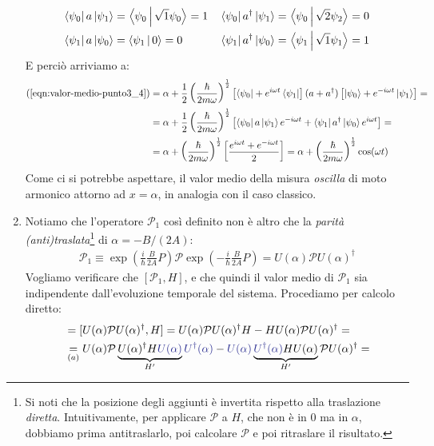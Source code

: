 \documentclass[../../FisicaTeorica.tex]{subfiles}
\begin{document}
\begin{enumerate}
\begin{align*}
\Bra{\psi_0}a\Ket{\psi_1} &= \Braket{\psi_0|\sqrt{1}\psi_0}=1 && \Bra{\psi_0} a^\dag \Ket{\psi_1} =\Braket{\psi_0|\sqrt{2}\psi_2}=0\\
\Bra{\psi_1}a\Ket{\psi_0} &= \Braket{\psi_1|0}= 0 && \Bra{\psi_1}a^\dag \Ket{\psi_0} = \Braket{\psi_1|\sqrt{1}\psi_1}=1
\end{align*}
E perciò arriviamo a:
\begin{align*}
(\ref{eqn:valor-medio-punto3_4}) &=\alpha+
\frac{1}{2}\left(\frac{\hbar}{2m\omega}\right)^\frac{1}{2} \left[\Bra{\psi_0} + e^{i\omega t}\Bra{\psi_1}\right](a+a^\dag) \left[\Ket{\psi_0} + e^{-i\omega t}\Ket{\psi_1}\right] =\\
&=\alpha + \frac{1}{2}\left(\frac{\hbar}{2m\omega}\right)^{\frac{1}{2}} \left[ \Bra{\psi_0}a\Ket{\psi_1} e^{-i\omega t} + \Bra{\psi_1}a^\dag \Ket{\psi_0} e^{i\omega t}\right] =\\
&=\alpha + \left(\frac{\hbar}{2m\omega}\right)^{\frac{1}{2}}\left[\frac{e^{i\omega t}+e^{-i\omega t}}{2}\right]=\alpha+\left(\frac{\hbar}{2m\omega}\right)^{\frac{1}{2}}\cos(\omega t)
\end{align*}
Come ci si potrebbe aspettare, il valor medio della misura \textit{oscilla} di moto armonico attorno ad $x=\alpha$, in analogia con il caso classico. 
\item Notiamo che l'operatore $\mathcal{P}_1$ così definito non è altro che la \textit{parità (anti)traslata}\footnote{Si noti che la posizione degli aggiunti è invertita rispetto alla traslazione \textit{diretta}. Intuitivamente, per applicare $\mathcal{P}$ a $H$, che non è  in $0$ ma in $\alpha$, dobbiamo prima antitraslarlo, poi calcolare $\mathcal{P}$ e poi ritraslare il risultato.} di $\alpha=-B/(2A)$: \begin{align*}
\mathcal{P}_1 \equiv \exp\left(\frac{i}{\hbar}\frac{B}{2A}P\right)\mathcal{P}\exp\left(-\frac{i}{\hbar}\frac{B}{2A}P\right)=U(\alpha)\mathcal{P}U(\alpha)^\dag
\end{align*}
Vogliamo verificare che $[\mathcal{P}_1, H]$, e che quindi il valor medio di $\mathcal{P}_1$ sia indipendente dall'evoluzione temporale del sistema. Procediamo per calcolo diretto:
\begin{align*}
[\mathcal{P}_1,H] &= [U(\alpha)\mathcal{P}U(\alpha)^\dag, H] = U(\alpha)\mathcal{P}U(\alpha)^\dag H - HU(\alpha)\mathcal{P}U(\alpha)^\dag=\\
&\underset{(a)}{=}U(\alpha) \mathcal{P}\underbrace{U(\alpha)^\dag H \textcolor{Blue}{U(\alpha)}}_{H'}\textcolor{Blue}{U^\dag(\alpha)} - \textcolor{Blue}{U(\alpha)}\underbrace{\textcolor{Blue}{U^\dag(\alpha)} HU(\alpha)}_{H'}\mathcal{P}U(\alpha)^\dag =\\

\end{align*}
\end{enumerate}
\end{document}
